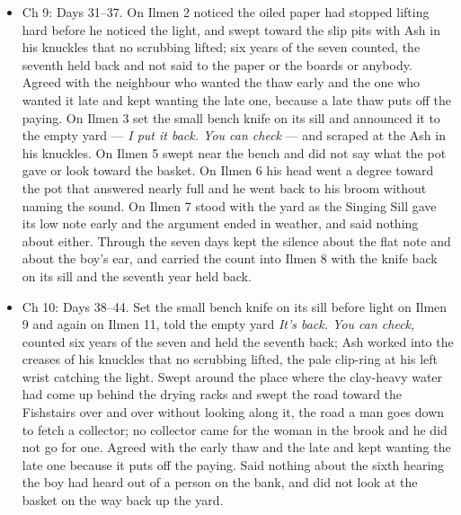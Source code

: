 \documentclass{design/chronicle}
\begin{document}
{\begin{itemize}[leftmargin=1.4em,itemsep=1pt,topsep=3pt,parsep=0pt]
\end{itemize}

\begin{itemize}[leftmargin=1.4em,itemsep=1pt,topsep=3pt,parsep=0pt]

\item Ch 9: Days 31–37. On Ilmen 2 noticed the oiled paper had stopped lifting hard before he noticed the light, and swept toward the slip pits with Ash in his knuckles that no scrubbing lifted; six years of the seven counted, the seventh held back and not said to the paper or the boards or anybody. Agreed with the neighbour who wanted the thaw early and the one who wanted it late and kept wanting the late one, because a late thaw puts off the paying. On Ilmen 3 set the small bench knife on its sill and announced it to the empty yard --- \emph{I put it back. You can check} --- and scraped at the Ash in his knuckles. On Ilmen 5 swept near the bench and did not say what the pot gave or look toward the basket. On Ilmen 6 his head went a degree toward the pot that answered nearly full and he went back to his broom without naming the sound. On Ilmen 7 stood with the yard as the Singing Sill gave its low note early and the argument ended in weather, and said nothing about either. Through the seven days kept the silence about the flat note and about the boy’s ear, and carried the count into Ilmen 8 with the knife back on its sill and the seventh year held back.

\end{itemize}

\begin{itemize}[leftmargin=1.4em,itemsep=1pt,topsep=3pt,parsep=0pt]

\item Ch 10: Days 38–44. Set the small bench knife on its sill before light on Ilmen 9 and again on Ilmen 11, told the empty yard \emph{It’s back. You can check}, counted six years of the seven and held the seventh back; Ash worked into the creases of his knuckles that no scrubbing lifted, the pale clip-ring at his left wrist catching the light. Swept around the place where the clay-heavy water had come up behind the drying racks and swept the road toward the Fishstairs over and over without looking along it, the road a man goes down to fetch a collector; no collector came for the woman in the brook and he did not go for one. Agreed with the early thaw and the late and kept wanting the late one because it puts off the paying. Said nothing about the sixth hearing the boy had heard out of a person on the bank, and did not look at the basket on the way back up the yard.

\end{itemize}
}
\end{document}

